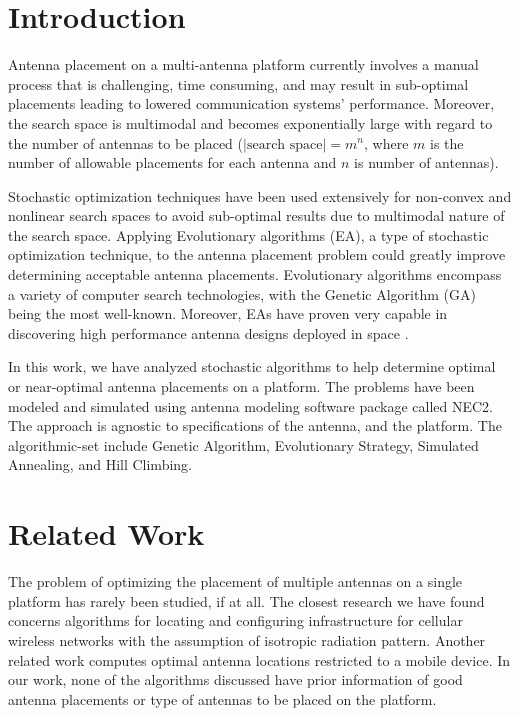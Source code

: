 \documentclass[conference]{IEEEtran}
\begin{document}
\section{Introduction}
Antenna placement on a multi-antenna platform currently involves a manual process that is challenging, time consuming, and may result in sub-optimal placements leading to lowered communication systems' performance. Moreover, the search space is multimodal and becomes exponentially large with regard to the number of antennas to be placed ($|\text{search space}| = m^n$, where $m$ is the number of allowable placements for each antenna and $n$ is number of antennas). 

Stochastic optimization techniques have been used extensively for non-convex and nonlinear search spaces to avoid sub-optimal results due to multimodal nature of the search space. Applying Evolutionary algorithms (EA), a type of stochastic optimization technique, to the antenna placement problem could greatly improve determining acceptable antenna placements. Evolutionary algorithms encompass a variety of computer search technologies, with the Genetic Algorithm (GA) being the most well-known. Moreover, EAs have proven very capable in discovering high performance antenna designs deployed in space \cite{lohn2005evolutionary}. 

In this work, we have analyzed stochastic algorithms to help determine optimal or near-optimal antenna placements on a platform. The problems have been modeled and simulated using antenna modeling software package called NEC2. The approach is agnostic to specifications of the antenna, and the platform. The algorithmic-set include Genetic Algorithm, Evolutionary Strategy, Simulated Annealing, and Hill Climbing.

\section{Related Work}
\label{sec:related}
The problem of optimizing the placement of multiple antennas on a single platform has rarely been studied, if at all.  The closest research we have found concerns algorithms for locating and configuring infrastructure for cellular wireless networks with the assumption of isotropic radiation pattern. Another related work computes optimal antenna locations restricted to a mobile device. In our work, none of the algorithms discussed have prior information of good antenna placements or type of antennas to be placed on the platform.
\end{document}
